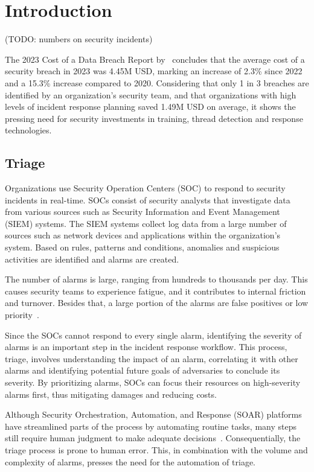 \section{Introduction}
\label{sec:introduction}

(TODO: numbers on security incidents) %

The 2023 Cost of a Data Breach Report by\ \citet{ibm2023cost} concludes that the average cost of a security breach in
2023 was 4.45M USD, marking an increase of 2.3\% since 2022 and a 15.3\% increase compared to 2020.
Considering that only 1 in 3 breaches are identified by an organization's security team, and that organizations with
high levels of incident response planning saved 1.49M USD on average, it shows the pressing need for security
investments in training, thread detection and response technologies.

\subsection{Triage}
\label{subsec:intro-triage}

Organizations use Security Operation Centers (SOC) to respond to security incidents in real-time.
SOCs consist of security analysts that investigate data from various sources such as Security Information and Event
Management (SIEM) systems.
The SIEM systems collect log data from a large number of sources such as network devices and applications within the
organization's system.
Based on rules, patterns and conditions, anomalies and suspicious activities are identified and alarms are created.

The number of alarms is large, ranging from hundreds to thousands per day.
This causes security teams to experience fatigue, and it contributes to internal friction and turnover.
Besides that, a large portion of the alarms are false positives or low priority\ \citep{orca2022fatigue}.

Since the SOCs cannot respond to every single alarm, identifying the severity of alarms is an important step in the
incident response workflow.
This process, triage, involves understanding the impact of an alarm, correlating it with other alarms and identifying
potential future goals of adversaries to conclude its severity.
By prioritizing alarms, SOCs can focus their resources on high-severity alarms first, thus mitigating damages and
reducing costs.

Although Security Orchestration, Automation, and Response (SOAR) platforms have streamlined parts of the process by
automating routine tasks, many steps still require human judgment to make adequate
decisions\ \citep{chuvakin2019triaging}.
Consequentially, the triage process is prone to human error.
This, in combination with the volume and complexity of alarms, presses the need for the automation of triage.

